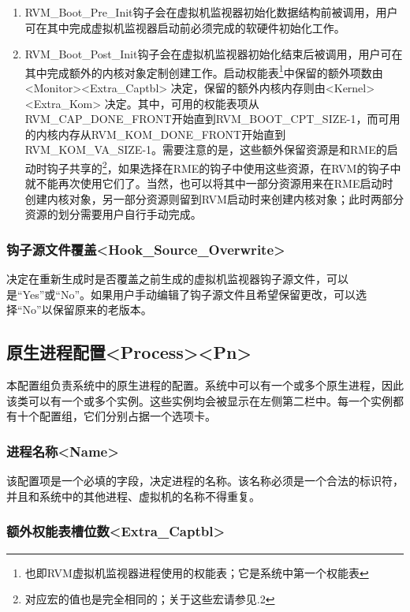 \begin{enumerate}
\def\labelenumi{\arabic{enumi}.}
\item
  RVM\_Boot\_Pre\_Init钩子会在虚拟机监视器初始化数据结构前被调用，用户可在其中完成虚拟机监视器启动前必须完成的软硬件初始化工作。
\item
  RVM\_Boot\_Post\_Init钩子会在虚拟机监视器初始化结束后被调用，用户可在其中完成额外的内核对象定制创建工作。启动权能表\footnote{也即RVM虚拟机监视器进程使用的权能表；它是系统中第一个权能表}中保留的额外项数由<Monitor><Extra\_Captbl> 决定，保留的额外内核内存则由<Kernel><Extra\_Kom> 决定。其中，可用的权能表项从RVM\_CAP\_DONE\_FRONT开始直到RVM\_BOOT\_CPT\_SIZE-1，而可用的内核内存从RVM\_KOM\_DONE\_FRONT开始直到RVM\_KOM\_VA\_SIZE-1。需要注意的是，这些额外保留资源是和RME的启动时钩子共享的\footnote{对应宏的值也是完全相同的；关于这些宏请参见.2}，如果选择在RME的钩子中使用这些资源，在RVM的钩子中就不能再次使用它们了。当然，也可以将其中一部分资源用来在RME启动时创建内核对象，另一部分资源则留到RVM启动时来创建内核对象；此时两部分资源的划分需要用户自行手动完成。
\end{enumerate}

\subsubsection{钩子源文件覆盖<Hook\_Source\_Overwrite>{}}\label{subsubsec:5-3-13-22}

决定在重新生成时是否覆盖之前生成的虚拟机监视器钩子源文件，可以是``Yes''或``No''。如果用户手动编辑了钩子源文件且希望保留更改，可以选择``No''以保留原来的老版本。

\subsection{原生进程配置<Process><Pn>{}}\label{subsec:5-3-14}

本配置组负责系统中的原生进程的配置。系统中可以有一个或多个原生进程，因此该类可以有一个或多个实例。这些实例均会被显示在左侧第二栏中。每一个实例都有十个配置组，它们分别占据一个选项卡。

\subsubsection{进程名称<Name>{}}\label{subsubsec:5-3-14-1}

该配置项是一个必填的字段，决定进程的名称。该名称必须是一个合法的标识符，并且和系统中的其他进程、虚拟机的名称不得重复。

\subsubsection{额外权能表槽位数<Extra\_Captbl>{}}\label{subsubsec:5-3-14-2}

